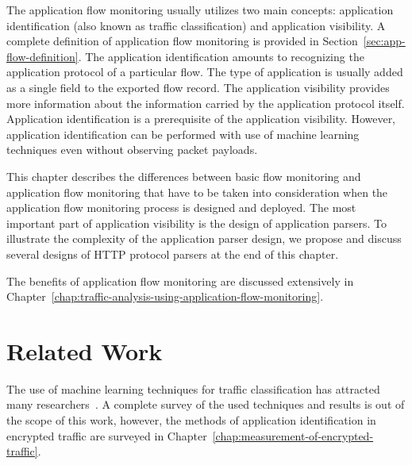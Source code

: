 The application flow monitoring usually utilizes two main concepts: application identification (also known as traffic classification) and application visibility. A complete definition of application flow monitoring is provided in Section~\ref{sec:app-flow-definition}. The application identification amounts to recognizing the application protocol of a particular flow. The type of application is usually added as a single field to the exported flow record. The application visibility provides more information about the information carried by the application protocol itself. Application identification is a prerequisite of the application visibility. However, application identification can be performed with use of machine learning techniques even without observing packet payloads.

This chapter describes the differences between basic flow monitoring and application flow monitoring that have to be taken into consideration when the application flow monitoring process is designed and deployed. The most important part of application visibility is the design of application parsers. To illustrate the complexity of the application parser design, we propose and discuss several designs of HTTP protocol parsers at the end of this chapter.

The benefits of application flow monitoring are discussed extensively in Chapter~\ref{chap:traffic-analysis-using-application-flow-monitoring}.

\section{Related Work}\label{sec:app-rel-work}


The use of machine learning techniques for traffic classification has attracted many researchers~\cite{Nguyen-2008-Survey, Dainotti-2012-Issues, Finsterbusch-2014-Survey}. A complete survey of the used techniques and results is out of the scope of this work, however, the methods of application identification in encrypted traffic are surveyed in Chapter~\ref{chap:measurement-of-encrypted-traffic}.

